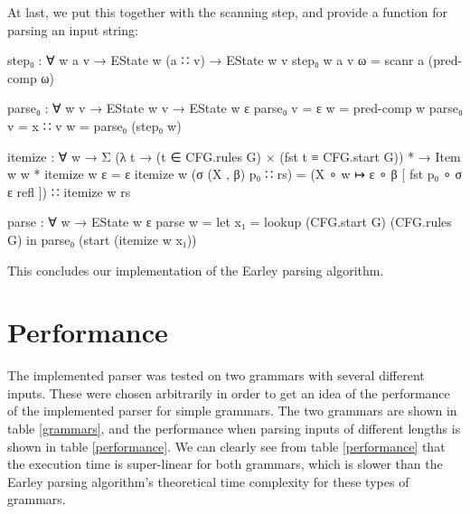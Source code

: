 		At last, we put this together with the scanning step, and provide a
		function for parsing an input string:

		\begin{code}
			  step₀ : ∀ {w a v} →
			    EState w (a ∷ v) →
			    EState w v
			  step₀ {w} {a} {v} ω = scanr a (pred-comp ω)

			  parse₀ : ∀ {w v} →
			     EState w v →
			     EState w ε
			  parse₀ {v = ε} w = pred-comp w
			  parse₀ {v = x ∷ v} w = parse₀ (step₀ w)

			  itemize : ∀ w →
			    Σ (λ t → (t ∈ CFG.rules G) × (fst t ≡ CFG.start G)) * →
			    Item w w *
			  itemize w ε = ε
			  itemize w (σ (X , β) p₀ ∷ rs) =
			    (X ∘ w ↦ ε ∘ β [ fst p₀ ∘ σ ε refl ]) ∷ itemize w rs

			  parse : ∀ w → EState w ε
			  parse w =
			    let x₁ = lookup (CFG.start G) (CFG.rules G) in
			    parse₀ (start (itemize w x₁))
		\end{code}

		This concludes our implementation of the Earley parsing algorithm.

	\section{Performance}
		
		The implemented parser was tested on two grammars with several
		different inputs. These were chosen arbitrarily in order to get an idea
		of the performance of the implemented parser for simple grammars. The
		two grammars are shown in table \ref{grammars}, and the performance
		when parsing inputs of different lengths is shown in table
		\ref{performance}. We can clearly see from table \ref{performance} that
		the execution time is super-linear for both grammars, which is slower 
		than the Earley parsing algorithm's theoretical time complexity for 
		these types of grammars.

